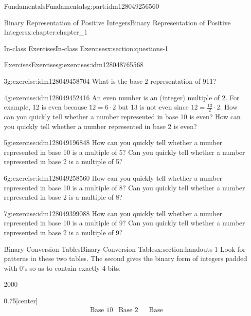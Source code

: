 \documentclass[oneside,10pt,]{book}
\numberwithin{equation}{section}
\begin{document}
\begin{partptx}{Fundamentals}{}{Fundamentals}{}{}{g:part:idm128049256560}
\begin{chapterptx}{Binary Representation of Positive Integers}{}{Binary Representation of Positive Integers}{}{}{x:chapter:chapter_1}
\begin{sectionptx}{In-class Exercises}{}{In-class Exercises}{}{}{x:section:questions-1}
\begin{exercises-subsection}{Exercises}{}{Exercises}{}{}{g:exercises:idm128048765568}
\begin{exercisegroup}
\begin{divisionexerciseeg}{3}{}{}{g:exercise:idm128049458704}
What is the base 2 representation of 911?%
\end{divisionexerciseeg}%
\begin{divisionexerciseeg}{4}{}{}{g:exercise:idm128049452416}%
An even number is an (integer) multiple of 2.  For example, 12 is even because \(12 = 6 \cdot 2\) but 13 is not even since \(12 = \frac{13}{2} \cdot 2\).  How can you quickly tell whether a number represented in base 10  is even?  How can you quickly tell whether a number represented in base 2  is even?%
\end{divisionexerciseeg}%
\begin{divisionexerciseeg}{5}{}{}{g:exercise:idm128049196848}%
How can you quickly tell whether a number represented in base 10  is a multiple of 5?  Can you quickly tell whether a number represented in base 2  is a multiple of 5?%
\end{divisionexerciseeg}%
\begin{divisionexerciseeg}{6}{}{}{g:exercise:idm128049258560}%
How can you quickly tell whether a number represented in base 10  is a multiple of 8? Can you quickly tell whether a number represented in base 2  is a multiple of 8?%
\end{divisionexerciseeg}%
\begin{divisionexerciseeg}{7}{}{}{g:exercise:idm128049399088}%
How can you quickly tell whether a number represented in base 10  is a multiple of 9?  Can you quickly tell whether a number represented in base 2  is a multiple of 9?%
\end{divisionexerciseeg}%
\end{exercisegroup}
\par\medskip\noindent
\end{exercises-subsection}
\end{sectionptx}
%
%
\typeout{************************************************}
\typeout{************************************************}
%
\begin{sectionptx}{Binary Conversion Tables}{}{Binary Conversion Tables}{}{}{x:section:handouts-1}
Look for patterns in these two tables. The second gives the binary form of integers padded with 0's so as to contain exactly 4 bits.%
\begin{sidebyside}{2}{0}{0}{0}%
\begin{sbspanel}{0.75}[center]%
%
\begin{equation*}
\begin{array}{ccccc}
\text{Base 10} & \text{Base
2} & \text{} & \text{Base
}
\end{array}
\end{equation*}
\end{sbspanel}
\end{sidebyside}
\end{sectionptx}
\end{chapterptx}
\end{partptx}
\end{document}
